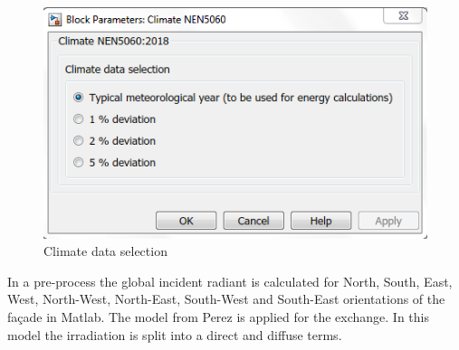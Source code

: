 \begin{figure}[H]
	\centering
	\includegraphics[width=0.8\columnwidth]{Pictures/climate data selection.png}
	\caption[Short title]{Climate data selection}
	\label{figure Climate data selection}
\end{figure}

In a pre-process the global incident radiant is calculated for North, South, East, West, North-West, North-East, South-West and South-East orientations of the façade in Matlab. The model from Perez is applied for the exchange. In this model the irradiation is split into a direct and diffuse terms.
\newpage
